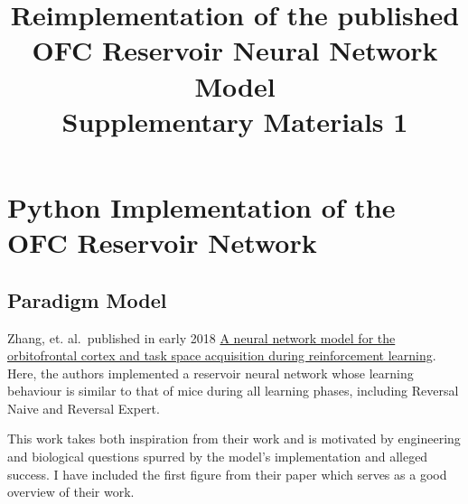 \documentclass[11pt]{article}
\title{Reimplementation of the published OFC Reservoir Neural Network Model \\
    	Supplementary Materials 1}
\begin{document}
    
    
    \maketitle
    
    

    
    \hypertarget{python-implementation-of-the-ofc-reservoir-network}{%
\section{Python Implementation of the OFC Reservoir
Network}\label{python-implementation-of-the-ofc-reservoir-network}}

\hypertarget{paradigm-model}{%
\subsection{Paradigm Model}\label{paradigm-model}}

Zhang, et. al.~published in early 2018
\href{https://journals.plos.org/ploscompbiol/article/file?id=10.1371/journal.pcbi.1005925\&type=printable}{A
neural network model for the orbitofrontal cortex and task space
acquisition during reinforcement learning}. Here, the authors
implemented a reservoir neural network whose learning behaviour is
similar to that of mice during all learning phases, including Reversal
Naive and Reversal Expert.

This work takes both inspiration from their work and is motivated by
engineering and biological questions spurred by the model's
implementation and alleged success. I have included the first figure
from their paper which serves as a good overview of their work.
\end{document}
